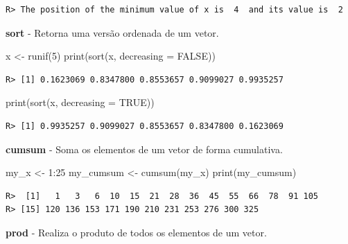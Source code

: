 \documentclass[
  11pt,
]{book}
\newenvironment{Shaded}{\begin{snugshade}}{\end{snugshade}}
\newcommand{\AttributeTok}[1]{\textcolor[rgb]{0.61,0.61,0.61}{#1}}
\newcommand{\ConstantTok}[1]{\textcolor[rgb]{0,0,0}{#1}}
\newcommand{\DecValTok}[1]{\textcolor[rgb]{0.06,0.06,0.06}{#1}}
\newcommand{\FunctionTok}[1]{\textcolor[rgb]{0,0,0}{#1}}
\newcommand{\NormalTok}[1]{#1}
\newcommand{\OtherTok}[1]{\textcolor[rgb]{0.37,0.37,0.37}{#1}}
\newcommand{\SpecialCharTok}[1]{\textcolor[rgb]{0,0,0}{#1}}
\begin{document}
\begin{verbatim}
R> The position of the minimum value of x is  4  and its value is  2
\end{verbatim}

\textbf{sort} - Retorna uma versão ordenada de um vetor.

\begin{Shaded}
\begin{Highlighting}[]
\NormalTok{x }\OtherTok{\textless{}{-}} \FunctionTok{runif}\NormalTok{(}\DecValTok{5}\NormalTok{)}
\FunctionTok{print}\NormalTok{(}\FunctionTok{sort}\NormalTok{(x, }\AttributeTok{decreasing =} \ConstantTok{FALSE}\NormalTok{))}
\end{Highlighting}
\end{Shaded}

\begin{verbatim}
R> [1] 0.1623069 0.8347800 0.8553657 0.9099027 0.9935257
\end{verbatim}

\begin{Shaded}
\begin{Highlighting}[]
\FunctionTok{print}\NormalTok{(}\FunctionTok{sort}\NormalTok{(x, }\AttributeTok{decreasing =} \ConstantTok{TRUE}\NormalTok{))}
\end{Highlighting}
\end{Shaded}

\begin{verbatim}
R> [1] 0.9935257 0.9099027 0.8553657 0.8347800 0.1623069
\end{verbatim}

\textbf{cumsum} - Soma os elementos de um vetor de forma cumulativa.

\begin{Shaded}
\begin{Highlighting}[]
\NormalTok{my\_x }\OtherTok{\textless{}{-}} \DecValTok{1}\SpecialCharTok{:}\DecValTok{25}
\NormalTok{my\_cumsum }\OtherTok{\textless{}{-}} \FunctionTok{cumsum}\NormalTok{(my\_x)}
\FunctionTok{print}\NormalTok{(my\_cumsum)}
\end{Highlighting}
\end{Shaded}

\begin{verbatim}
R>  [1]   1   3   6  10  15  21  28  36  45  55  66  78  91 105
R> [15] 120 136 153 171 190 210 231 253 276 300 325
\end{verbatim}

\textbf{prod} - Realiza o produto de todos os elementos de um vetor.
\end{document}
